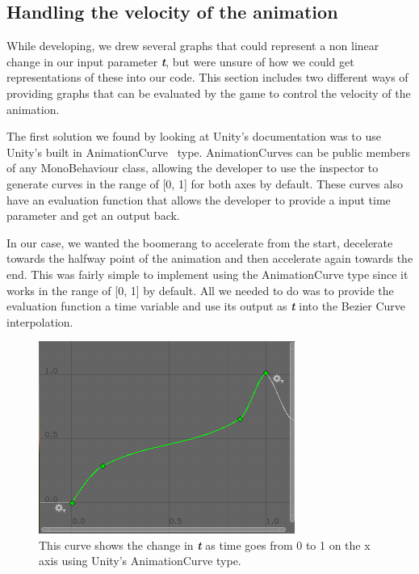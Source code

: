 \subsection{Handling the velocity of the animation}
While developing, we drew several graphs that could represent a non linear change in our input parameter \textbf{\textit{t}}, but were unsure of how we could get representations of these into our code.  This section includes two different ways of providing graphs that can be evaluated by the game to control the velocity of the animation.

The first solution we found by looking at Unity's documentation was to use Unity's built in AnimationCurve~\cite{unityDocumentationAnimationCurve} type. AnimationCurves can be public members of any MonoBehaviour class, allowing the developer to use the inspector to generate curves in the range of [0, 1] for both axes by default. These curves also have an evaluation function that allows the developer to provide a input time parameter and get an output back. 

In our case, we wanted the boomerang to accelerate from the start, decelerate towards the halfway point of the animation and then accelerate again towards the end. This was fairly simple to implement using the AnimationCurve type since it works in the range of [0, 1] by default. All we needed to do was to provide the evaluation function a time variable and use its output as \textbf{\textit{t}} into the Bezier Curve interpolation. 
    
\begin{figure}[tbph]  %
  \centering
  \includegraphics[width=.5\textwidth]{images/BoomerangAnimationCurve}
  \caption[The animation curve representing the change in \textbf{\textit{t}}]{This curve shows the change in \textbf{\textit{t}} as time goes from 0 to 1 on the x axis using Unity's AnimationCurve type.}
  \label{fig:boomerangcurve0}
\end{figure}

